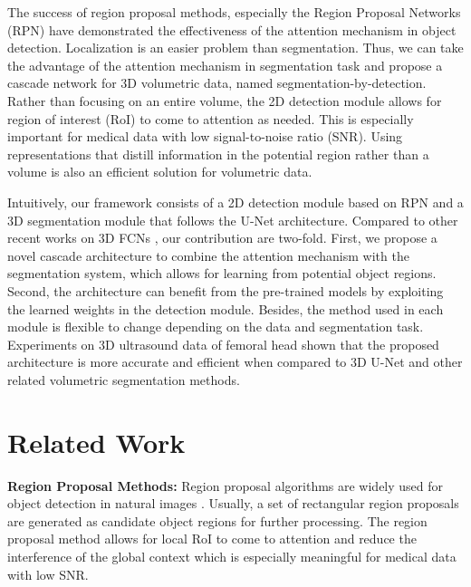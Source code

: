 The success of region proposal methods, especially the Region Proposal Networks (RPN) \cite{ren2015faster} have demonstrated the effectiveness of the attention mechanism in object detection. 
Localization is an easier problem than segmentation. Thus, 
we can take the advantage of the attention mechanism in segmentation task and propose a cascade network for 3D volumetric data, named segmentation-by-detection.
Rather than focusing on an entire volume, the 2D detection module allows for region of interest (RoI) to come to attention as needed. This is especially important for medical data with low signal-to-noise ratio (SNR). Using representations that distill information in the potential region rather than a volume is also an efficient solution for volumetric data.

Intuitively, our framework consists of a 2D detection module based on RPN \cite{ren2015faster} and a 3D segmentation module that follows the U-Net architecture. Compared to other recent works on 3D FCNs \cite{milletari2016v,cciccek20163d,dolz20173d,he2017mask}, our contribution are two-fold. First, we propose a novel cascade architecture to combine the attention mechanism with the segmentation system, 
which allows for learning from potential object regions.
Second, the architecture can benefit from the pre-trained models by exploiting the learned weights in the detection module. Besides, the method used in each module is flexible to change depending on the data and segmentation task.
Experiments on 3D ultrasound data of femoral head shown that the proposed architecture is more accurate and efficient when compared to 3D U-Net and other related volumetric segmentation methods.


\section{Related Work}
\textbf{Region Proposal Methods:} 
Region proposal algorithms are widely used for object detection in natural images \cite{girshick2014rich}. Usually, a set of rectangular region proposals are generated as candidate object regions for further processing. The region proposal method allows for local RoI to come to attention and reduce the interference of the global context which is especially meaningful for medical data with low SNR. 

